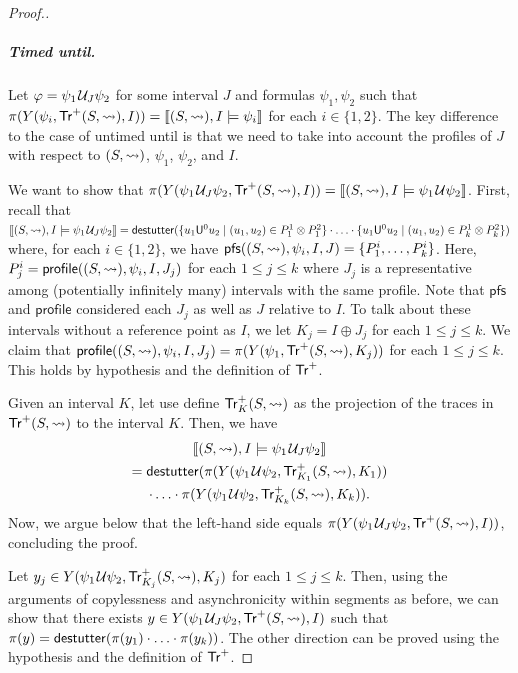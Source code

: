 \begin{proof}[\normalsize Proof.]
	\subparagraph*{Timed until.}
	Let $\varphi = \psi_1 \kern.1em\mathcal{U}_J \psi_2$ for some interval $J$ and formulas $\psi_1, \psi_2$ such that $\pi(Y(\psi_i, \mathsf{Tr}^+(S,{\rightsquigarrow}), I)) = \llbracket (S,{\rightsquigarrow}), I \models \psi_i \rrbracket$ for each $i \in \{1,2\}$.
	The key difference to the case of untimed until is that we need to take into account the profiles of $J$ with respect to $(S,{\rightsquigarrow})$, $\psi_1$, $\psi_2$, and $I$.
	
	We want to show that $\pi(Y(\psi_1 \kern.1em\mathcal{U}_J \psi_2, \mathsf{Tr}^+(S,{\rightsquigarrow}), I)) = \llbracket (S,{\rightsquigarrow}), I \models \psi_1 \kern.1em\mathcal{U} \psi_2 \rrbracket$.
	First, recall that $\llbracket (S,{\hb}), I \models \psi_1 \until_J \psi_2 \rrbracket = \destutter( \{ u_1 \mathsf{U}^0 u_2 \st (u_1, u_2) \in P^1_1 \otimes P^2_1 \} \cdot \ldots \cdot \{ u_1 \mathsf{U}^0 u_2 \st (u_1, u_2) \in P^1_k \otimes P^2_k \} )$ where, for each $i \in \{1,2\}$, we have $\mathsf{pfs}((S,{\rightsquigarrow}), \psi_i, I, J) = \{P^i_1, \ldots, P^i_k\}$.
	Here, $P^i_j = \mathsf{profile}((S,{\rightsquigarrow}), \psi_i, I, J_j)$ for each $1 \leq j \leq k$ where $J_j$ is a representative among (potentially infinitely many) intervals with the same profile.
	Note that $\mathsf{pfs}$ and $\mathsf{profile}$ considered each $J_j$ as well as $J$ relative to $I$.
	To talk about these intervals without a reference point as $I$, we let $K_j = I \oplus J_j$ for each $1 \leq j \leq k$.
	We claim that $\mathsf{profile}((S,{\rightsquigarrow}), \psi_i, I, J_j) = \pi(Y(\psi_1, \mathsf{Tr}^+(S,{\rightsquigarrow}), K_j))$ for each $1 \leq j \leq k$.
	This holds by hypothesis and the definition of $\mathsf{Tr}^+$.
	
	Given an interval $K$, let use define $\mathsf{Tr}^+_K(S,{\rightsquigarrow})$ as the projection of the traces in $\mathsf{Tr}^+(S,{\rightsquigarrow})$ to the interval $K$.
	Then, we have
	\begin{multline*}
		\llbracket (S,{\rightsquigarrow}), I \models \psi_1 \kern.1em\mathcal{U}_J \psi_2 \rrbracket \\
		= \mathsf{destutter}( \pi(Y(\psi_1 \kern.1em\mathcal{U} \psi_2, \mathsf{Tr}^+_{K_1}(S,{\rightsquigarrow}), K_1)) \\
		\cdot \ldots \cdot \pi(Y(\psi_1 \kern.1em\mathcal{U} \psi_2, \mathsf{Tr}^+_{K_k}(S,{\rightsquigarrow}), K_k)).
	\end{multline*}
	Now, we argue below that the left-hand side equals $\pi(Y(\psi_1 \kern.1em\mathcal{U}_J \psi_2, \mathsf{Tr}^+(S,{\rightsquigarrow}), I ))$, concluding the proof.

	Let $y_j \in Y(\psi_1 \kern.1em\mathcal{U} \psi_2, \mathsf{Tr}^+_{K_j}(S,{\rightsquigarrow}), K_j)$ for each $1 \leq j \leq k$.
	Then, using the arguments of copylessness and asynchronicity within segments as before, we can show that there exists $y \in Y(\psi_1 \kern.1em\mathcal{U}_J \psi_2, \mathsf{Tr}^+(S,{\rightsquigarrow}), I)$ such that $\pi(y) = \mathsf{destutter}( \pi(y_1) \cdot \ldots \cdot \pi(y_k) )$.
	The other direction can be proved using the hypothesis and the definition of $\mathsf{Tr}^+$.
\end{proof}


